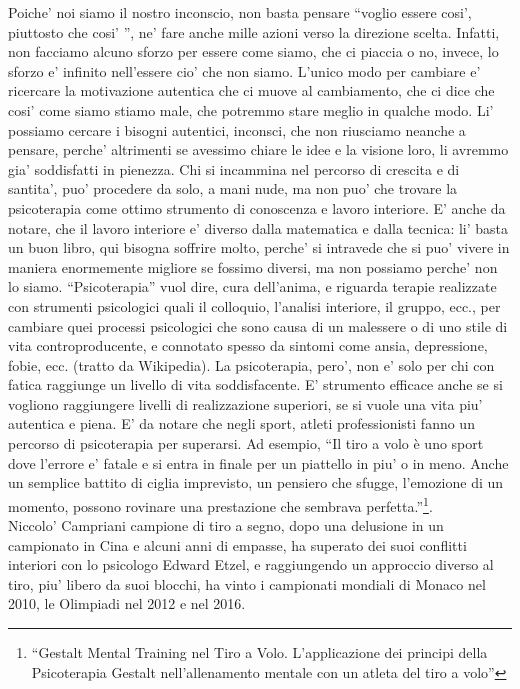 Poiche' noi siamo il nostro inconscio, non basta pensare ``voglio essere cosi', piuttosto che cosi' '', ne' fare anche mille azioni verso la direzione scelta. Infatti, non facciamo alcuno sforzo per essere come siamo, che ci piaccia o no, invece, lo sforzo e' infinito nell'essere cio' che non siamo. L'unico modo per cambiare e' ricercare la motivazione autentica che ci muove al cambiamento, che ci dice che cosi' come siamo stiamo male, che potremmo stare meglio in qualche modo. Li' possiamo cercare i bisogni autentici, inconsci, che non riusciamo neanche a pensare, perche' altrimenti se avessimo chiare le idee e la visione loro, li avremmo gia' soddisfatti in pienezza. Chi si incammina nel percorso di crescita e di santita', puo' procedere da solo, a mani nude, ma non puo' che trovare la psicoterapia come ottimo strumento di conoscenza e lavoro interiore. E' anche da notare, che il lavoro interiore e' diverso dalla matematica e dalla tecnica: li' basta un buon libro, qui bisogna soffrire molto, perche' si intravede che si puo' vivere in maniera enormemente migliore se fossimo diversi, ma non possiamo perche' non lo siamo. 
``Psicoterapia'' vuol dire, cura dell'anima, e riguarda terapie realizzate con strumenti psicologici quali il colloquio, l'analisi interiore, il gruppo, ecc., per cambiare quei processi psicologici che sono causa di un malessere o di uno stile di vita controproducente, e connotato spesso da sintomi come ansia, depressione, fobie, ecc. (tratto da Wikipedia).
La psicoterapia, pero', non e' solo per chi con fatica raggiunge un livello di vita soddisfacente. E' strumento efficace anche se si vogliono raggiungere livelli di realizzazione superiori, se si vuole una vita piu' autentica e piena.
E' da notare che negli sport, atleti professionisti fanno un percorso di psicoterapia per superarsi. Ad esempio, ``Il tiro a volo è uno sport dove l’errore e' fatale e si entra in finale per un piattello in piu' o in meno. Anche un semplice battito di ciglia imprevisto, un pensiero che sfugge, l’emozione di un momento, possono rovinare una prestazione che sembrava perfetta.''\footnote{ ``Gestalt Mental Training nel Tiro a Volo. L'applicazione dei principi della Psicoterapia Gestalt nell'allenamento mentale con un atleta del tiro a volo''}.\\
Niccolo' Campriani campione di tiro a segno, dopo una delusione in un campionato in Cina e alcuni anni di empasse, ha superato dei suoi conflitti interiori con lo psicologo Edward Etzel, e raggiungendo un approccio diverso al tiro, piu' libero da suoi blocchi, ha vinto i campionati mondiali di Monaco nel 2010, le Olimpiadi nel 2012 e nel 2016.

